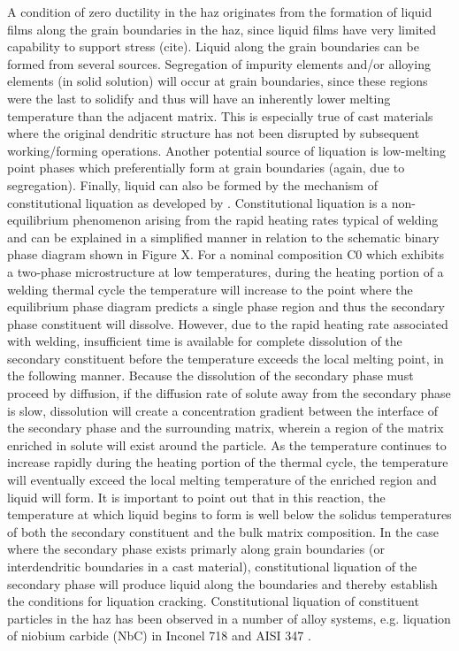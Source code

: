 A condition of zero ductility in the \gls{haz} originates from the formation of liquid films along the grain boundaries in the \gls{haz}, since liquid films have very limited capability to support stress (cite). Liquid along the grain boundaries can be formed from several sources. Segregation of impurity elements and/or alloying elements (in solid solution) will occur at grain boundaries, since these regions were the last to solidify and thus will have an inherently lower melting temperature than the adjacent matrix. This is especially true of cast materials where the original dendritic structure has not been disrupted by subsequent working/forming operations. Another potential source of liquation is low-melting point phases which preferentially form at grain boundaries (again, due to segregation). Finally, liquid can also be formed by the mechanism of constitutional liquation as developed by \citet{pepe_effects_1967}. Constitutional liquation is a non-equilibrium phenomenon arising from the rapid heating rates typical of welding and can be explained in a simplified manner in relation to the schematic binary phase diagram shown in Figure X. For a nominal composition C0 which exhibits a two-phase microstructure at low temperatures, during the heating portion of a welding thermal cycle the temperature will increase to the point where the equilibrium phase diagram predicts a single phase region and thus the secondary phase constituent will dissolve. However, due to the rapid heating rate associated with welding, insufficient time is available for complete dissolution of the secondary constituent before the temperature exceeds the local melting point, in the following manner. Because the dissolution of the secondary phase must proceed by diffusion, if the diffusion rate of solute away from the secondary phase is slow, dissolution will create a concentration gradient between the interface of the secondary phase and the surrounding matrix, wherein a region of the matrix enriched in solute will exist around the particle. As the temperature continues to increase rapidly during the heating portion of the thermal cycle, the temperature will eventually exceed the local melting temperature of the enriched region and liquid will form. It is important to point out that in this reaction, the temperature at which liquid begins to form is well below the solidus temperatures of both the secondary constituent and the bulk matrix composition. In the case where the secondary phase exists primarly along grain boundaries (or interdendritic boundaries in a cast material), constitutional liquation of the secondary phase will produce liquid along the boundaries and thereby establish the conditions for liquation cracking. Constitutional liquation of constituent particles in the \gls{haz} has been observed in a number of alloy systems, e.g. liquation of niobium carbide (NbC) in Inconel 718 \cite{radhakrishnan_phase_1991} and AISI 347 \cite{lee_weldability_1988}.

